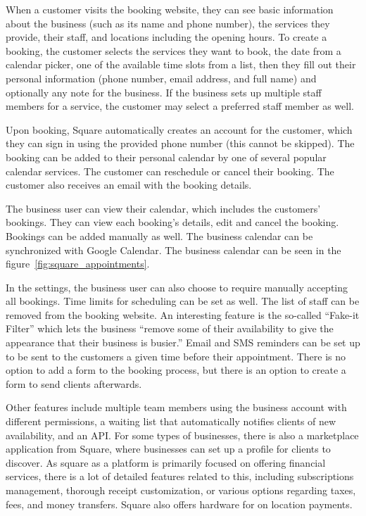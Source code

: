 When a customer visits the booking website, they can see basic information about the business (such as its name and phone number), the services they provide, their staff, and locations including the opening hours. To create a booking, the customer selects the services they want to book, the date from a calendar picker, one of the available time slots from a list, then they fill out their personal information (phone number, email address, and full name) and optionally any note for the business. If the business sets up multiple staff members for a service, the customer may select a preferred staff member as well.

Upon booking, Square automatically creates an account for the customer, which they can sign in using the provided phone number (this cannot be skipped). The booking can be added to their personal calendar by one of several popular calendar services. The customer can reschedule or cancel their booking. The customer also receives an email with the booking details.

The business user can view their calendar, which includes the customers' bookings. They can view each booking's details, edit and cancel the booking. Bookings can be added manually as well. The business calendar can be synchronized with Google Calendar. The business calendar can be seen in the figure~\ref{fig:square_appointments}.

In the settings, the business user can also choose to require manually accepting all bookings. Time limits for scheduling can be set as well. The list of staff can be removed from the booking website. An interesting feature is the so-called \enquote{Fake-it Filter} which lets the business \enquote{remove some of their availability to give the appearance that their business is busier.} Email and SMS reminders can be set up to be sent to the customers a given time before their appointment. There is no option to add a form to the booking process, but there is an option to create a form to send clients afterwards.

Other features include multiple team members using the business account with different permissions, a waiting list that automatically notifies clients of new availability, and an API. For some types of businesses, there is also a marketplace application from Square, where businesses can set up a profile for clients to discover. As square as a platform is primarily focused on offering financial services, there is a lot of detailed features related to this, including subscriptions management, thorough receipt customization, or various options regarding taxes, fees, and money transfers. Square also offers hardware for on location payments.

